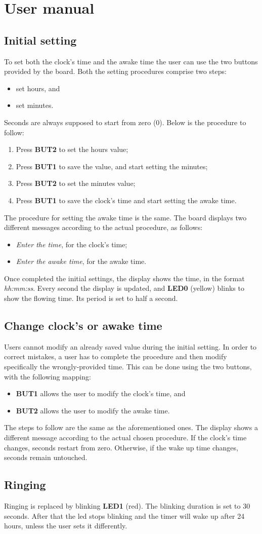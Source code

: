 \section{User manual}
\subsection{Initial setting}
To set both the clock's time and the awake time the user can use the two buttons provided by the board. Both the setting procedures comprise two steps:
\begin{itemize}
	\item set hours, and
	\item set minutes.
\end{itemize}
Seconds are always supposed to start from zero (0). Below is the procedure to follow:
\begin{enumerate}
	\item Press \textbf{BUT2} to set the hours value;
	\item Press \textbf{BUT1} to save the value, and start setting the minutes;
	\item Press \textbf{BUT2} to set the minutes value;
	\item Press \textbf{BUT1} to save the clock's time and start setting the awake time.
\end{enumerate}
The procedure for setting the awake time is the same. The board displays two different messages according to the actual procedure, as follows:
\begin{itemize}
	\item \textit{Enter the time}, for the clock's time;
	\item \textit{Enter the awake time}, for the awake time.
\end{itemize}
Once completed the initial settings, the display shows the time, in the format \textit{hh:mm:ss}. Every second the display is updated, and \textbf{LED0} (yellow) blinks to show the flowing time. Its period is set to half a second.

\subsection{Change clock's or awake time}
Users cannot modify an already saved value during the initial setting. In order to correct mistakes, a user has to complete the procedure and then modify specifically the wrongly-provided time. This can be done using the two buttons, with the following mapping:
\begin{itemize}
	\item \textbf{BUT1} allows the user to modify the clock's time, and
	\item \textbf{BUT2} allows the user to modify the awake time.
\end{itemize}
The steps to follow are the same as the aforementioned ones. The display shows a different message according to the actual chosen procedure. If the clock's time changes, seconds restart from zero. Otherwise, if the wake up time changes, seconds remain untouched.

\subsection{Ringing}
Ringing is replaced by blinking \textbf{LED1} (red). The blinking duration is set to 30 seconds. After that the led stops blinking and the timer will wake up after 24 hours, unless the user sets it differently.

